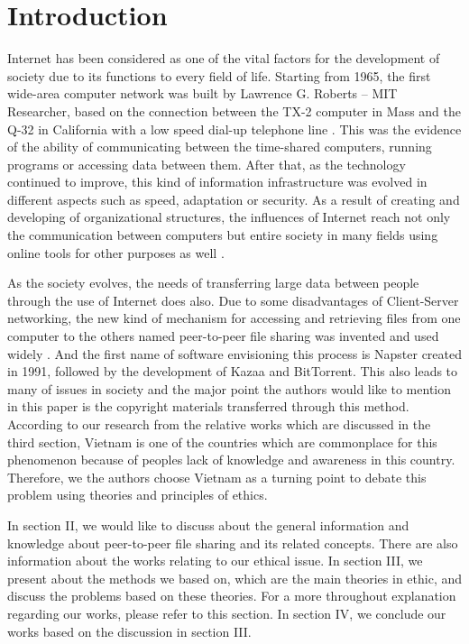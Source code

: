 \documentclass[conference]{IEEEtran}
\begin{document}
\section{Introduction} \label{intro}
Internet has been considered as one of the vital factors for the development of society due to its functions to every field of life. Starting from 1965, the first wide-area computer network was built by Lawrence G. Roberts – MIT Researcher, based on the connection between the TX-2 computer in Mass and the Q-32 in California with a low speed dial-up telephone line \cite{historyofinternet}. This was the evidence of the ability of communicating between the time-shared computers, running programs or accessing data between them. After that, as the technology continued to improve, this kind of information infrastructure was evolved in different aspects such as speed, adaptation or security. As a result of creating and developing of organizational structures, the influences of Internet reach not only the communication between computers but entire society in many fields using online tools for other purposes as well \cite{historyofinternet}. 

As the society evolves, the needs of transferring large data between people through the use of Internet does also.  Due to some disadvantages of Client-Server networking, the new kind of mechanism for accessing and retrieving files from one computer to the others named peer-to-peer file sharing was invented and used widely \cite{clientserver}. And the first name of software envisioning this process is Napster created in 1991, followed by the development of Kazaa and BitTorrent. This also leads to many of issues in society and the major point the authors would like to mention in this paper is the copyright materials transferred through this method. According to our research from the relative works which are discussed in the third section, Vietnam is one of the countries which are commonplace for this phenomenon because of peoples lack of knowledge and awareness in this country. Therefore, we the authors choose Vietnam as a turning point to debate this problem using theories and principles of ethics.

In section II, we would like to discuss about the general information and knowledge about peer-to-peer file sharing and its related concepts. There are also information about the works relating to our ethical issue. In section III, we present about the methods we based on, which are the main theories in ethic, and discuss the problems based on these theories. For a more throughout explanation regarding our works, please refer to this section. In section IV, we conclude our works based on the discussion in section III.
\end{document}
